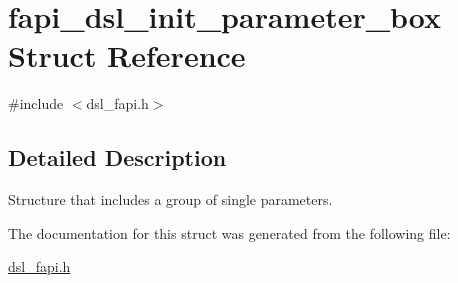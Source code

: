 \hypertarget{structfapi__dsl__init__parameter__box}{\section{fapi\-\_\-dsl\-\_\-init\-\_\-parameter\-\_\-box Struct Reference}
\label{structfapi__dsl__init__parameter__box}
}


{\ttfamily \#include $<$dsl\-\_\-fapi.\-h$>$}



\subsection{Detailed Description}
Structure that includes a group of single parameters. 

The documentation for this struct was generated from the following file\-:\begin{DoxyCompactItemize}
\item 
\hyperlink{dsl__fapi_8h}{dsl\-\_\-fapi.\-h}\end{DoxyCompactItemize}
